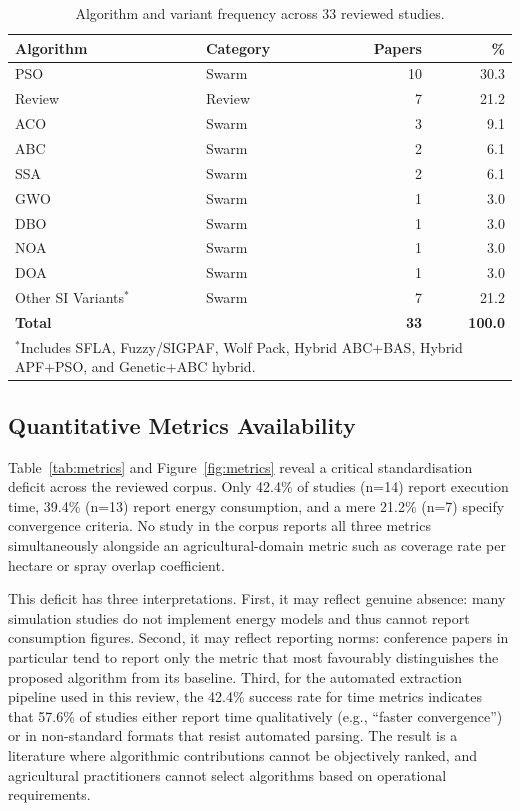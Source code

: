 \documentclass[review,3p,times]{elsarticle}
\begin{document}
\begin{table}[htbp]
\centering
\caption{Algorithm and variant frequency across 33 reviewed studies.}
\label{tab:algorithms}
\begin{tabular}{llrr}
\toprule
\textbf{Algorithm} & \textbf{Category} & \textbf{Papers} & \textbf{\%} \\
\midrule
PSO & Swarm & 10 & 30.3 \\
Review & Review & 7 & 21.2 \\
ACO & Swarm & 3 & 9.1 \\
ABC & Swarm & 2 & 6.1 \\
SSA & Swarm & 2 & 6.1 \\
GWO & Swarm & 1 & 3.0 \\
DBO & Swarm & 1 & 3.0 \\
NOA & Swarm & 1 & 3.0 \\
DOA & Swarm & 1 & 3.0 \\
Other SI Variants$^*$ & Swarm & 7 & 21.2 \\
\midrule
\textbf{Total} & & \textbf{33} & \textbf{100.0} \\
\bottomrule
\multicolumn{4}{l}{$^*$Includes SFLA, Fuzzy/SIGPAF, Wolf Pack, Hybrid ABC+BAS, Hybrid APF+PSO, and Genetic+ABC hybrid.}
\end{tabular}
\end{table}

\subsection{Quantitative Metrics Availability}
Table~\ref{tab:metrics} and Figure~\ref{fig:metrics} reveal a critical standardisation deficit across the reviewed corpus. Only 42.4\% of studies (n=14) report execution time, 39.4\% (n=13) report energy consumption, and a mere 21.2\% (n=7) specify convergence criteria. No study in the corpus reports all three metrics simultaneously alongside an agricultural-domain metric such as coverage rate per hectare or spray overlap coefficient.

This deficit has three interpretations. First, it may reflect genuine absence: many simulation studies do not implement energy models and thus cannot report consumption figures. Second, it may reflect reporting norms: conference papers in particular tend to report only the metric that most favourably distinguishes the proposed algorithm from its baseline. Third, for the automated extraction pipeline used in this review, the 42.4\% success rate for time metrics indicates that 57.6\% of studies either report time qualitatively (e.g., ``faster convergence'') or in non-standard formats that resist automated parsing. The result is a literature where algorithmic contributions cannot be objectively ranked, and agricultural practitioners cannot select algorithms based on operational requirements.
\end{document}
